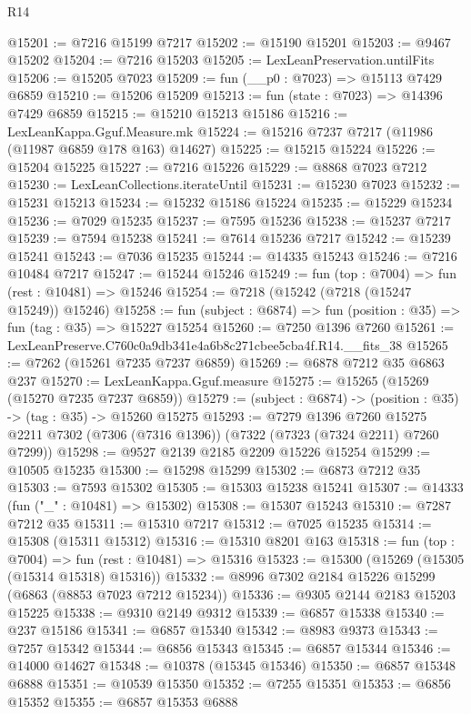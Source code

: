 \begin{lexlean}{R14}
\begin{coremodule}
@15201 := @7216 @15199 @7217
@15202 := @15190 @15201
@15203 := @9467 @15202
@15204 := @7216 @15203
@15205 := LexLeanPreservation.untilFits
@15206 := @15205 @7023
@15209 := fun (__p0 : @7023) => @15113 @7429 @6859
@15210 := @15206 @15209
@15213 := fun (state : @7023) => @14396 @7429 @6859
@15215 := @15210 @15213 @15186
@15216 := LexLeanKappa.Gguf.Measure.mk
@15224 := @15216 @7237 @7217 (@11986 (@11987 @6859 @178 @163) @14627)
@15225 := @15215 @15224
@15226 := @15204 @15225
@15227 := @7216 @15226
@15229 := @8868 @7023 @7212
@15230 := LexLeanCollections.iterateUntil
@15231 := @15230 @7023
@15232 := @15231 @15213
@15234 := @15232 @15186 @15224
@15235 := @15229 @15234
@15236 := @7029 @15235
@15237 := @7595 @15236
@15238 := @15237 @7217
@15239 := @7594 @15238
@15241 := @7614 @15236 @7217
@15242 := @15239 @15241
@15243 := @7036 @15235
@15244 := @14335 @15243
@15246 := @7216 @10484 @7217
@15247 := @15244 @15246
@15249 := fun (top : @7004) => fun (rest : @10481) => @15246
@15254 := @7218 (@15242 (@7218 (@15247 @15249)) @15246)
@15258 := fun (subject : @6874) => fun (position : @35) => fun (tag : @35) => @15227 @15254
@15260 := @7250 @1396 @7260
@15261 := LexLeanPreserve.C760c0a9db341e4a6b8c271cbee5cba4f.R14.__fits_38
@15265 := @7262 (@15261 @7235 @7237 @6859)
@15269 := @6878 @7212 @35 @6863 @237
@15270 := LexLeanKappa.Gguf.measure
@15275 := @15265 (@15269 (@15270 @7235 @7237 @6859))
@15279 := (subject : @6874) -> (position : @35) -> (tag : @35) -> @15260 @15275
@15293 := @7279
    @1396
    @7260
    @15275
    @2211
    @7302
    (@7306 (@7316 @1396))
    (@7322 (@7323 (@7324 @2211) @7260 @7299))
@15298 := @9527 @2139 @2185 @2209 @15226 @15254
@15299 := @10505 @15235
@15300 := @15298 @15299
@15302 := @6873 @7212 @35
@15303 := @7593 @15302
@15305 := @15303 @15238 @15241
@15307 := @14333 (fun ("_" : @10481) => @15302)
@15308 := @15307 @15243
@15310 := @7287 @7212 @35
@15311 := @15310 @7217
@15312 := @7025 @15235
@15314 := @15308 (@15311 @15312)
@15316 := @15310 @8201 @163
@15318 := fun (top : @7004) => fun (rest : @10481) => @15316
@15323 := @15300 (@15269 (@15305 (@15314 @15318) @15316))
@15332 := @8996 @7302 @2184 @15226 @15299 (@6863 (@8853 @7023 @7212 @15234))
@15336 := @9305 @2144 @2183 @15203 @15225
@15338 := @9310 @2149 @9312
@15339 := @6857 @15338
@15340 := @237 @15186
@15341 := @6857 @15340
@15342 := @8983 @9373
@15343 := @7257 @15342
@15344 := @6856 @15343
@15345 := @6857 @15344
@15346 := @14000 @14627
@15348 := @10378 (@15345 @15346)
@15350 := @6857 @15348 @6888
@15351 := @10539 @15350
@15352 := @7255 @15351
@15353 := @6856 @15352
@15355 := @6857 @15353 @6888

\end{coremodule}
\end{lexlean}
